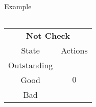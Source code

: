 \documentclass[usenames,dvipsnames,aspectratio=169,11pt, envcountsect]{beamer}
\begin{document}
\begin{frame}[noframenumbering]{Example}
\begin{table}[H]
\begin{minipage}{0.29\textwidth}
\begin{tabular}{c | c}
			\end{tabular}
			\vspace{0.5cm} %
		\end{minipage}\hspace{0.5cm} %
		\begin{minipage}{0.29\textwidth}
			\centering
			\begin{tabular}{c | c}
				\multicolumn{2}{c}{\textbf{Not Check}}  \\
				State       & Actions                   \\
				\hline
				Outstanding & \multirow{3}{*}{ \( 0 \)} \\
				Good        &                           \\
				Bad         &                           \\
			\end{tabular}
			\vspace{0.5cm} %
		\end{minipage}
	\end{table}

\end{frame}
\end{document}
